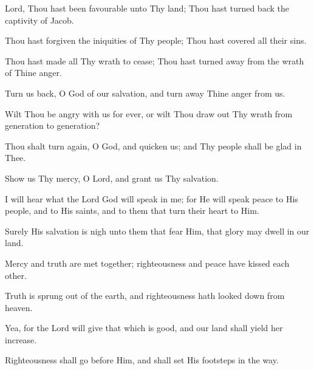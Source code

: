 Lord, Thou hast been favourable unto Thy land; Thou hast turned back the captivity of Jacob.

Thou hast forgiven the iniquities of Thy people; Thou hast covered all their sins.

Thou hast made all Thy wrath to cease; Thou hast turned away from the wrath of Thine anger.

Turn us back, O God of our salvation, and turn away Thine anger from us.

Wilt Thou be angry with us for ever, or wilt Thou draw out Thy wrath from generation to generation?

Thou shalt turn again, O God, and quicken us; and Thy people shall be glad in Thee.

Show us Thy mercy, O Lord, and grant us Thy salvation.

I will hear what the Lord God will speak in me; for He will speak peace to His people, and to His saints, and to them that turn their heart to Him.

Surely His salvation is nigh unto them that fear Him, that glory may dwell in our land.

Mercy and truth are met together; righteousness and peace have kissed each other.

Truth is sprung out of the earth, and righteousness hath looked down from heaven.

Yea, for the Lord will give that which is good, and our land shall yield her increase.

Righteousness shall go before Him, and shall set His footsteps in the way.
